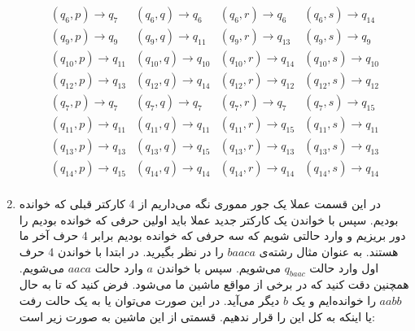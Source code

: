 \begin{enumerate}
\[\begin{array}{cccc}
        (q_6, p) \rightarrow q_{7} & (q_6, q) \rightarrow q_{6} & (q_6, r) \rightarrow q_{6} & (q_6, s) \rightarrow q_{14}\\
        (q_9, p) \rightarrow q_{9} & (q_9, q) \rightarrow q_{11} & (q_9, r) \rightarrow q_{13} & (q_9, s) \rightarrow q_{9}\\
        (q_{10}, p) \rightarrow q_{11} & (q_{10}, q) \rightarrow q_{10} & (q_{10}, r) \rightarrow q_{14} & (q_{10}, s) \rightarrow q_{10}\\
        (q_{12}, p) \rightarrow q_{13} & (q_{12}, q) \rightarrow q_{14} & (q_{12}, r) \rightarrow q_{12} & (q_{12}, s) \rightarrow q_{12}\\
        (q_{7}, p) \rightarrow q_{7} & (q_{7}, q) \rightarrow q_{7} & (q_{7}, r) \rightarrow q_{7} & (q_{7}, s) \rightarrow q_{15}\\
        (q_{11}, p) \rightarrow q_{11} & (q_{11}, q) \rightarrow q_{11} & (q_{11}, r) \rightarrow q_{15} & (q_{11}, s) \rightarrow q_{11}\\
        (q_{13}, p) \rightarrow q_{13} & (q_{13}, q) \rightarrow q_{15} & (q_{13}, r) \rightarrow q_{13} & (q_{13}, s) \rightarrow q_{13}\\
        (q_{14}, p) \rightarrow q_{15} & (q_{14}, q) \rightarrow q_{14} & (q_{14}, r) \rightarrow q_{14} & (q_{14}, s) \rightarrow q_{14}\\
    \end{array}
    \]
    \item در این قسمت عملا یک جور مموری نگه می‌داریم از 4 کارکتر قبلی که خوانده بودیم. سپس با خواندن یک
    کارکتر جدید عملا باید اولین حرفی که خوانده بودیم را دور بریزیم و وارد حالتی شویم که سه حرفی که خوانده
    بودیم برابر 4 حرف آخر ما هستند. به عنوان مثال رشته‌ی
    $baaca$
    را در نظر بگیرید. در ابتدا با خواندن 4 حرف اول وارد حالت
    $q_{baac}$
    می‌شویم. سپس با خواندن
    $a$
    وارد حالت
    $aaca$
    می‌شویم. همچنین دقت کنید که در برخی از مواقع ماشین ما
    می‌شود. فرض کنید که تا به حال
    $aabb$
    را خوانده‌ایم و یک
    $b$
    دیگر می‌آید. در این صورت می‌توان یا به یک حالت
    رفت یا اینکه به کل این
    را قرار ندهیم.
    قسمتی از این ماشین به صورت زیر است:
    \begin{latin}
        \centering
\end{latin}
\end{enumerate}

